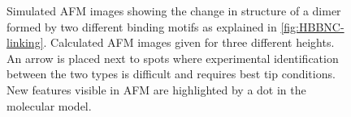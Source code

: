 \begin{figure}[] \centering
	\caption{Simulated AFM images showing the change in structure of a dimer formed by two different binding motifs as explained in \autoref{fig:HBBNC-linking}. Calculated AFM images given for three different heights. An arrow is placed next to spots where experimental identification between the two types is difficult and requires best tip conditions. New features visible in AFM are highlighted by a dot in the molecular model.}
	\label{fig:HBBNC-ring-structure}
\end{figure}

